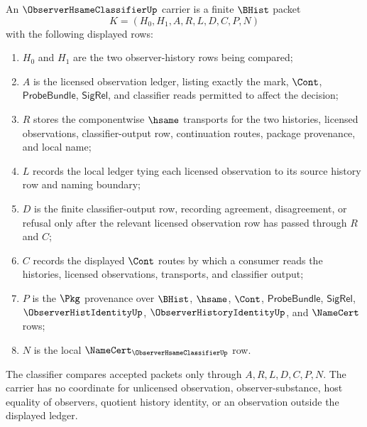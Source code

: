 \begin{definition}
\label{def:observer-hsame-classifier-carrier}
An $\ObserverHsameClassifierUp$ carrier is a finite $\BHist$ packet
$$
K=(H_0,H_1,A,R,L,D,C,P,N)
$$
with the following displayed rows:
\begin{enumerate}
\item $H_0$ and $H_1$ are the two observer-history rows being compared;
\item $A$ is the licensed observation ledger, listing exactly the mark, $\Cont$, $\mathsf{ProbeBundle}$, $\mathsf{SigRel}$, and classifier reads permitted to affect the decision;
\item $R$ stores the componentwise $\hsame$ transports for the two histories, licensed observations, classifier-output row, continuation routes, package provenance, and local name;
\item $L$ records the local ledger tying each licensed observation to its source history row and naming boundary;
\item $D$ is the finite classifier-output row, recording agreement, disagreement, or refusal only after the relevant licensed observation row has passed through $R$ and $C$;
\item $C$ records the displayed $\Cont$ routes by which a consumer reads the histories, licensed observations, transports, and classifier output;
\item $P$ is the $\Pkg$ provenance over $\BHist$, $\hsame$, $\Cont$, $\mathsf{ProbeBundle}$, $\mathsf{SigRel}$, $\ObserverHistIdentityUp$, $\ObserverHistoryIdentityUp$, and $\NameCert$ rows;
\item $N$ is the local $\NameCert_{\ObserverHsameClassifierUp}$ row.
\end{enumerate}
The classifier compares accepted packets only through $A,R,L,D,C,P,N$. The carrier has no coordinate for unlicensed observation, observer-substance, host equality of observers, quotient history identity, or an observation outside the displayed ledger.
\end{definition}

